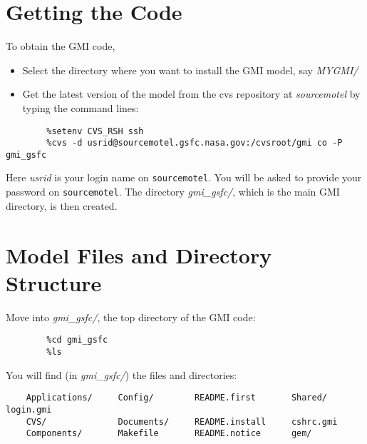 \section{Getting the Code}
%
To obtain the GMI code,
%
\begin{itemize}
\item Select the directory where you want to install the GMI model, 
      say {\em MYGMI/}
\item Get the latest version of the model from the cvs repository at 
      {\em sourcemotel} by typing the command lines:
\end{itemize}
%
\begin{verbatim}
        %setenv CVS_RSH ssh
        %cvs -d usrid@sourcemotel.gsfc.nasa.gov:/cvsroot/gmi co -P gmi_gsfc
\end{verbatim}
%
Here {\em usrid} is your login name on {\tt sourcemotel}.
You will be asked to provide your password on {\tt sourcemotel}. 
The directory {\em gmi\_gsfc/}, which is the main GMI directory,
is then created.
%
\section{Model Files and Directory Structure}
%
\noindent
Move into {\em gmi\_gsfc/}, the top directory of the GMI code:
%
\begin{verbatim}
        %cd gmi_gsfc
        %ls
\end{verbatim}
%
You will find (in {\em gmi\_gsfc/}) the files and directories:
%
\begin{verbatim}
    Applications/     Config/        README.first       Shared/       login.gmi
    CVS/              Documents/     README.install     cshrc.gmi
    Components/       Makefile       README.notice      gem/
\end{verbatim}
%

%
